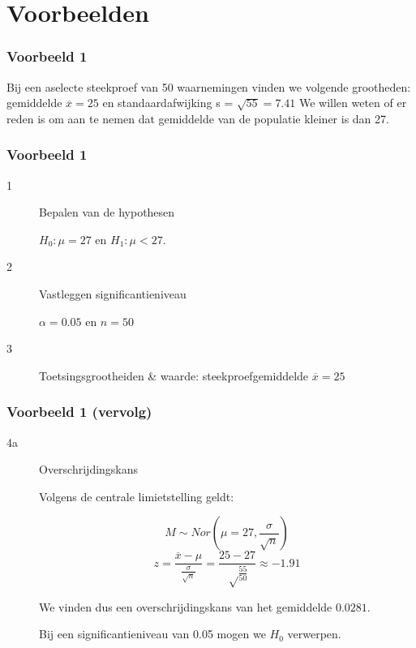 \documentclass[aspectratio=169]{beamer}
\begin{document}
\section{Voorbeelden}

\begin{frame}
  \frametitle{Voorbeeld 1}
  Bij een aselecte steekproef van 50 waarnemingen vinden we volgende grootheden: gemiddelde $\overline{x} = 25$ en standaardafwijking s = $\sqrt{55} = 7.41$
  We willen weten of er reden is om aan te nemen dat gemiddelde van de populatie kleiner is dan 27.

\end{frame}

\begin{frame}
  \frametitle{Voorbeeld 1}
  
  \begin{description}
    \item[1] Bepalen van de hypothesen
    
      $H_{0} : \mu = 27$ en $H_{1}: \mu < 27$.
      
    \item[2] Vastleggen significantieniveau
    
      $\alpha = 0.05$ en $n=50$
      
    \item[3] Toetsingsgrootheiden \& waarde: steekproefgemiddelde $\overline{x} = 25$
    

  \end{description}
\end{frame}

\begin{frame}
  \frametitle{Voorbeeld 1 (vervolg)}

  \begin{description}
    \item[4a] Overschrijdingskans
    
    Volgens de centrale limietstelling geldt:
    
    \[ M \sim Nor(\mu = 27, \frac{\sigma}{\sqrt{n}}) \]
    \[ z = \frac{\overline{x} - \mu}{\frac{\sigma}{\sqrt{n}}} = \frac{25-27}{\sqrt\frac{55}{50}} \approx -1.91\]
    
    We vinden dus een overschrijdingskans van het gemiddelde $0.0281$.
    
    
    Bij een significantieniveau van 0.05 mogen we $H_{0}$ verwerpen.
  \end{description}

\end{frame}
\end{document}
